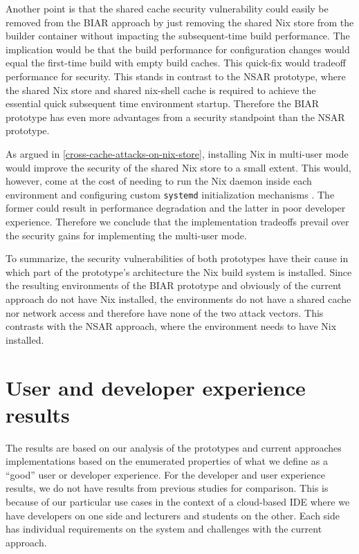 Another point is that the shared cache security vulnerability could easily be removed from the BIAR approach by just removing the shared Nix store from the builder container without impacting the subsequent-time build performance. The implication would be that the build performance for configuration changes would equal the first-time build with empty build caches. This quick-fix would tradeoff performance for security. This stands in contrast to the NSAR prototype, where the shared Nix store and shared nix-shell cache is required to achieve the essential quick subsequent time environment startup. Therefore the BIAR prototype has even more advantages from a security standpoint than the NSAR prototype.

As argued in \ref{cross-cache-attacks-on-nix-store}, installing Nix in multi-user mode would improve the security of the shared Nix store to a small extent. This would, however, come at the cost of needing to run the Nix daemon inside each environment and configuring custom \verb|systemd| initialization mechanisms \cite{NixMultiUser}. The former could result in performance degradation and the latter in poor developer experience. Therefore we conclude that the implementation tradeoffs prevail over the security gains for implementing the multi-user mode.

To summarize, the security vulnerabilities of both prototypes have their cause in which part of the prototype's architecture the Nix build system is installed. Since the resulting environments of the BIAR prototype and obviously of the current approach do not have Nix installed, the environments do not have a shared cache nor network access and therefore have none of the two attack vectors. This contrasts with the NSAR approach, where the environment needs to have Nix installed.
\section{User and developer experience results}\label{discussion:UX-and-DevX}
The results are based on our analysis of the prototypes and current approaches implementations based on the enumerated properties of what we define as a ``good'' user or developer experience. For the developer and user experience results, we do not have results from previous studies for comparison. This is because of our particular use cases in the context of a cloud-based IDE where we have developers on one side and lecturers and students on the other. Each side has individual requirements on the system and challenges with the current approach. 

